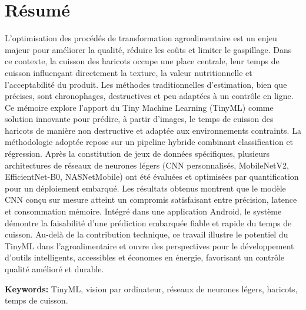 \chapter*{Résumé}

L’optimisation des procédés de transformation agroalimentaire est un enjeu majeur pour améliorer la qualité, réduire les coûts et limiter le gaspillage. Dans ce contexte, la cuisson des haricots occupe une place centrale, leur temps de cuisson influençant directement la texture, la valeur nutritionnelle et l’acceptabilité du produit. Les méthodes traditionnelles d’estimation, bien que précises, sont chronophages, destructives et peu adaptées à un contrôle en ligne. Ce mémoire explore l’apport du Tiny Machine Learning (TinyML) comme solution innovante pour prédire, à partir d’images, le temps de cuisson des haricots de manière non destructive et adaptée aux environnements contraints. La méthodologie adoptée repose sur un pipeline hybride combinant classification et régression. Après la constitution de jeux de données spécifiques, plusieurs architectures de réseaux de neurones légers (CNN personnalisés, MobileNetV2, EfficientNet-B0, NASNetMobile) ont été évaluées et optimisées par quantification pour un déploiement embarqué. Les résultats obtenus montrent que le modèle CNN conçu sur mesure atteint un compromis satisfaisant entre précision, latence et consommation mémoire. Intégré dans une application Android, le système démontre la faisabilité d’une prédiction embarquée fiable et rapide du temps de cuisson. Au-delà de la contribution technique, ce travail illustre le potentiel du TinyML dans l’agroalimentaire et ouvre des perspectives pour le développement d’outils intelligents, accessibles et économes en énergie, favorisant un contrôle qualité amélioré et durable.

\vspace{0.5cm}
\noindent\textbf{Keywords:} TinyML, vision par ordinateur, réseaux de neurones légers, haricots, temps de cuisson.